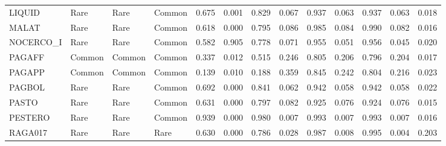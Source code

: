 \begin{tiny}
\begin{longtable}{|l|l|l|l|r|r|r|r|r|r|r|r|r|}
    LIQUID &            Rare &                         Rare &         Common &          0.675 &   0.001 &                    0.829 &                  0.067 &                  0.937 &                  0.063 &                  0.937 &                  0.063 &              0.018 \\
    MALAT &            Rare &                         Rare &         Common &          0.618 &   0.000 &                    0.795 &                  0.086 &                  0.985 &                  0.084 &                  0.990 &                  0.082 &              0.016 \\
    NOCERCO\_I &            Rare &                         Rare &         Common &          0.582 &   0.905 &                    0.778 &                  0.071 &                  0.955 &                  0.051 &                  0.956 &                  0.045 &              0.020 \\
    PAGAFF &          Common &                       Common &         Common &          0.337 &   0.012 &                    0.515 &                  0.246 &                  0.805 &                  0.206 &                  0.796 &                  0.204 &              0.017 \\
    PAGAPP &          Common &                       Common &         Common &          0.139 &   0.010 &                    0.188 &                  0.359 &                  0.845 &                  0.242 &                  0.804 &                  0.216 &              0.023 \\
    PAGBOL &            Rare &                         Rare &         Common &          0.692 &   0.000 &                    0.841 &                  0.062 &                  0.942 &                  0.058 &                  0.942 &                  0.058 &              0.022 \\
    PASTO &            Rare &                         Rare &         Common &          0.631 &   0.000 &                    0.797 &                  0.082 &                  0.925 &                  0.076 &                  0.924 &                  0.076 &              0.015 \\
    PESTERO &            Rare &                         Rare &         Common &          0.939 &   0.000 &                    0.980 &                  0.007 &                  0.993 &                  0.007 &                  0.993 &                  0.007 &              0.016 \\
    \rowcolor{Kol2023}
    RAGA017 &            Rare &                         Rare &           Rare &          0.630 &   0.000 &                    0.786 &                  0.028 &                  0.987 &                  0.008 &                  0.995 &                  0.004 &              0.203 \\

\end{longtable}
\end{tiny}

